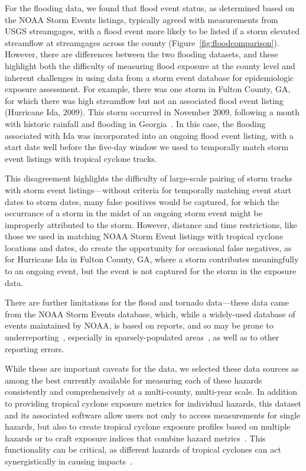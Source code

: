 For the flooding data, we found that flood event status, as determined based on
the NOAA Storm Events listings, typically agreed with measurements from
\ac{USGS} streamgages, with a flood event more likely to be listed if a storm
elevated streamflow at streamgages across the county
(Figure~\ref{fig:floodcomparison}).  However, there are differences between the
two flooding datasets, and these highlight both the difficulty of measuring
flood exposure at the county level and inherent challenges in using data from a
storm event database for epidemiologic exposure assessment.  For example, there
was one storm in Fulton County, GA, for which there was high streamflow but not
an associated flood event listing (Hurricane Ida, 2009).  This storm occurred
in November 2009, following a month with historic rainfall and flooding in
Georgia~\parencite{shepherd2011overview}.  In this case, the flooding
associated with Ida was incorporated into an ongoing flood event listing, with
a start date well before the five-day window we used to temporally match storm
event listings with tropical cyclone tracks. 

This disagreement highlights the difficulty of large-scale pairing of storm
tracks with storm event listings---without criteria for temporally matching
event start dates to storm dates, many false positives would be
captured, for which the occurrance of a storm in the midst of an ongoing storm
event might be improperly attributed to the storm.  However, distance
and time restrictions, like those we used in matching NOAA Storm Event listings
with tropical cyclone locations and dates, do create the opportunity for
occasional false negatives, as for Hurricane Ida in Fulton County, GA, where a
storm contributes meaningfully to an ongoing event, but the event is not
captured for the storm in the exposure data.  

There are further limitations for the flood and tornado data---these data came
from the \ac{NOAA} Storm Events database, which, while a widely-used database
of events maintained by \ac{NOAA}, is based on reports, and so may be prone to
underreporting~\parencite{Ashley2008flood, Curran2000}, especially in
sparsely-populated areas~\parencite{Witt1998, Ashley2007}, as well as to other
reporting errors. 

While these are important caveats for the data, we selected these data sources
as among the best currently available for measuring each of these hazards
consistently and comprehensively at a multi-county, multi-year scale. In
addition to providing tropical cyclone exposure metrics for individual hazards,
this dataset and its associated software allow users not only to access
measurements for single hazards, but also to create tropical cyclone exposure
profiles based on multiple hazards or to craft exposure indices that combine
hazard metrics~\parencite{chakraborty2005population, peduzzi2009assessing}.
This functionality can be critical, as different hazards of tropical cyclones can
act synergistically in causing impacts~\parencite{smith2009}.  


